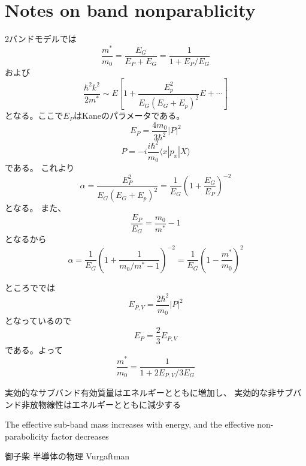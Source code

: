 \documentclass[11pt,uplatex,a4paper]{jsarticle}
\begin{document}

\appendix
\section{Notes on band nonparablicity}
2バンドモデルでは\cite{mikoshiba}
\begin{equation}
 \frac{m^*}{m_0} = \frac{E_G}{E_P+E_G} = \frac{1}{1+E_P/E_G}
\end{equation}
および
\begin{equation}
 \frac{\hbar^2k^2}{2m^*} \sim
  E \left[ 1 + \frac{E_p^2}{E_G(E_G+E_p)^2}E + \cdots
	\right]
\end{equation}
となる。ここで$E_P$はKaneのパラメータである。
\begin{equation}
 E_P = \frac{4 m_0}{3 \hbar^2}|P|^2
\end{equation}
\begin{equation}
 P=-i\frac{i\hbar^2}{m_0}\langle x | p_x| X\rangle
\end{equation}
である。
これより
\begin{equation}
 \alpha = \frac{E_P^2}{E_G(E_G+E_p)^2} = \frac{1}{E_G}(1+\frac{E_G}{E_P})^{-2}
\end{equation}
となる。
また、
\begin{equation}
 \frac{E_P}{E_G} = \frac{m_0}{m^*}-1
\end{equation}
となるから
\begin{equation}
 \alpha = \frac{1}{E_G} (1+\frac{1}{m_0/m^*-1})^{-2}
  = \frac{1}{E_G} (1-\frac{m^*}{m_0})^2
\end{equation}

ところで\cite{Vurgaftman}では
\begin{equation}
 E_{P,V}=\frac{2\hbar^2}{m_0}|P|^2
\end{equation}
となっているので
\begin{equation}
 E_P =\frac{2}{3}E_{P,V}
\end{equation}
である。よって
\begin{equation}
 \frac{m^*}{m_0} =  \frac{1}{1+2E_{P,V}/3E_G}
\end{equation}

実効的なサブバンド有効質量はエネルギーとともに増加し、
実効的な非サブバンド非放物線性はエネルギーとともに減少する

The effective sub-band mass increases with energy, and the effective non-parabolicity factor decreases



 \begin{thebibliography}{99}
  御子柴 半導体の物理
  Vurgaftman
 \end{thebibliography}
\end{document}
